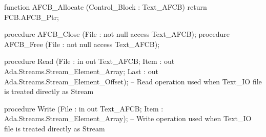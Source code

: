    function AFCB_Allocate (Control_Block : Text_AFCB) return FCB.AFCB_Ptr;

   procedure AFCB_Close (File : not null access Text_AFCB);
   procedure AFCB_Free  (File : not null access Text_AFCB);

   procedure Read
     (File : in out Text_AFCB;
      Item : out Ada.Streams.Stream_Element_Array;
      Last : out Ada.Streams.Stream_Element_Offset);
   --  Read operation used when Text_IO file is treated directly as Stream

   procedure Write
     (File : in out Text_AFCB;
      Item : Ada.Streams.Stream_Element_Array);
   --  Write operation used when Text_IO file is treated directly as Stream

